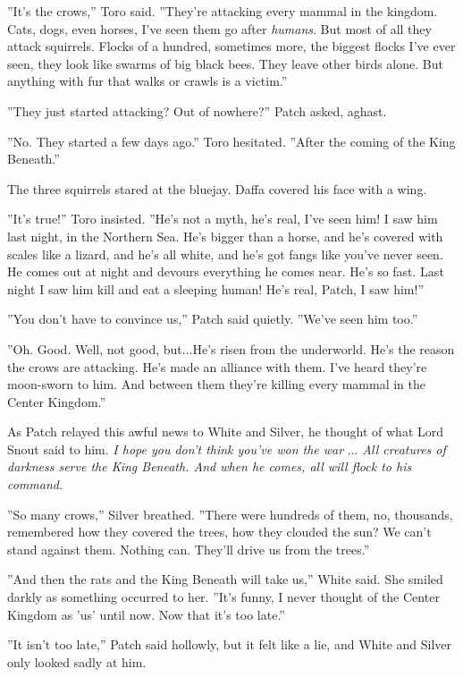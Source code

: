 \documentclass[12pt]{book}
\begin{document}
 ''It's the crows,'' Toro said. ''They're attacking every mammal in the kingdom. Cats, dogs, even horses, I've seen them go after {\it humans}. But most of all they attack squirrels. Flocks of a hundred, sometimes more, the biggest flocks I've ever seen, they look like swarms of big black bees. They leave other birds alone. But anything with fur that walks or crawls is a victim.''\par
 ''They just started attacking? Out of nowhere?'' Patch asked, aghast.\par
 ''No. They started a few days ago.'' Toro hesitated. ''After the coming of the King Beneath.''\par
 The three squirrels stared at the bluejay. Daffa covered his face with a wing.\par
 ''It's true!'' Toro insisted. ''He's not a myth, he's real, I've seen him! I saw him last night, in the Northern Sea. He's bigger than a horse, and he's covered with scales like a lizard, and he's all white, and he's got fangs like you've never seen. He comes out at night and devours everything he comes near. He's so fast. Last night I saw him kill and eat a sleeping human! He's real, Patch, I saw him!''\par
 ''You don't have to convince us,'' Patch said quietly. ''We've seen him too.''\par
 ''Oh. Good. Well, not good, but...He's risen from the underworld. He's the reason the crows are attacking. He's made an alliance with them. I've heard they're moon-sworn to him. And between them they're killing every mammal in the Center Kingdom.''\par
 As Patch relayed this awful news to White and Silver, he thought of what Lord Snout said to him. {\it I hope you don't think you've won the war} ... {\it All creatures of darkness serve the King Beneath. And when he comes, all will flock to his command.}\par
 ''So many crows,'' Silver breathed. ''There were hundreds of them, no, thousands, remembered how they covered the trees, how they clouded the sun? We can't stand against them. Nothing can. They'll drive us from the trees.''\par
 ''And then the rats and the King Beneath will take us,'' White said. She smiled darkly as something occurred to her. ''It's funny, I never thought of the Center Kingdom as 'us' until now. Now that it's too late.''\par
 ''It isn't too late,'' Patch said hollowly, but it felt like a lie, and White and Silver only looked sadly at him.\par
\end{document}
